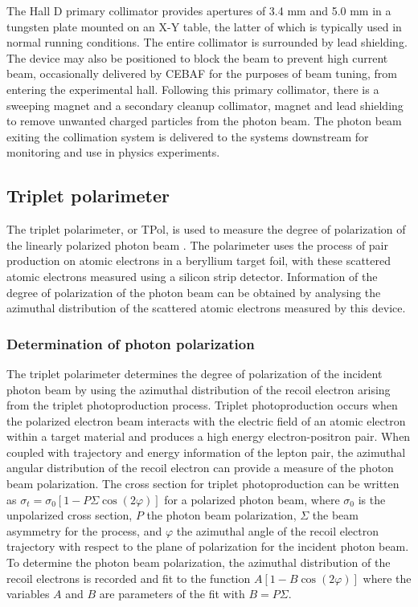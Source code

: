 The Hall D primary collimator provides apertures of 3.4 mm and 5.0 mm in a tungsten plate mounted on an X-Y table, the latter of which is typically used in normal \GX{} running conditions.
The entire collimator is surrounded by lead shielding.
The device may also be positioned to block the beam to prevent high current beam, occasionally delivered by CEBAF for the purposes of beam tuning, from entering the experimental hall. Following this primary collimator, there is a sweeping magnet and a secondary cleanup collimator, magnet and 
lead shielding to remove unwanted charged particles from the photon beam. The photon beam exiting the collimation system is delivered to the systems downstream for monitoring and use in physics experiments.

\subsection{Triplet polarimeter \label{sec:tpol}}
The triplet polarimeter, or TPol, is used to measure the degree of polarization of the linearly polarized photon beam \cite{DUGGER2017115}.
The polarimeter uses the process of pair production on atomic electrons in a beryllium target foil, with these scattered atomic electrons measured using a silicon strip detector.
Information of the degree of polarization of the photon beam can be obtained by analysing the azimuthal distribution of the scattered atomic electrons measured by this device.

\subsubsection{Determination of photon polarization \label{sec:polarization}}
The triplet polarimeter determines the degree of polarization of the incident photon beam by using the azimuthal distribution of the recoil electron arising from the triplet photoproduction process.
Triplet photoproduction occurs when the polarized electron beam interacts with the electric field of an atomic electron within a target material and produces a high energy electron-positron pair.
When coupled with trajectory and energy information of the lepton pair, the azimuthal angular distribution of the recoil electron can provide a measure of the photon beam polarization.
The cross section for triplet photoproduction can be written as $\sigma_t = \sigma_0 [ 1 - P \Sigma \cos(2\varphi)]$ for a polarized photon beam, where $\sigma_0$ is the unpolarized cross section, $P$ the photon beam polarization, $\Sigma$ the beam asymmetry for the process, and $\varphi$ the azimuthal angle of the recoil electron trajectory with respect to the plane of polarization for the incident photon beam.
To determine the photon beam polarization, the azimuthal distribution of the recoil electrons is recorded and fit to the function $A [ 1- B \cos(2\varphi)]$  where the variables $A$ and $B$ are parameters of the fit with $B = P \Sigma$.

